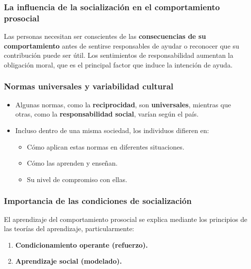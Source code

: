 \documentclass[
]{book}
\providecommand{\tightlist}{%
  \setlength{\itemsep}{0pt}\setlength{\parskip}{0pt}}
\begin{document}
\subsubsection{La influencia de la socialización en el comportamiento prosocial}\label{la-influencia-de-la-socializaciuxf3n-en-el-comportamiento-prosocial}

Las personas necesitan ser conscientes de las \textbf{consecuencias de su comportamiento} antes de sentirse responsables de ayudar o reconocer que su contribución puede ser útil. Los sentimientos de responsabilidad aumentan la obligación moral, que es el principal factor que induce la intención de ayuda.

\subsubsection{Normas universales y variabilidad cultural}\label{normas-universales-y-variabilidad-cultural}

\begin{itemize}
\tightlist
\item
  Algunas normas, como la \textbf{reciprocidad}, son \textbf{universales}, mientras que otras, como la \textbf{responsabilidad social}, varían según el país.\\
\item
  Incluso dentro de una misma sociedad, los individuos difieren en:

  \begin{itemize}
  \tightlist
  \item
    Cómo aplican estas normas en diferentes situaciones.
  \item
    Cómo las aprenden y enseñan.
  \item
    Su nivel de compromiso con ellas.
  \end{itemize}
\end{itemize}

\subsubsection{Importancia de las condiciones de socialización}\label{importancia-de-las-condiciones-de-socializaciuxf3n}

El aprendizaje del comportamiento prosocial se explica mediante los principios de las teorías del aprendizaje, particularmente:

\begin{enumerate}
\def\labelenumi{\arabic{enumi}.}
\tightlist
\item
  \textbf{Condicionamiento operante (refuerzo).}
\item
  \textbf{Aprendizaje social (modelado).}
\end{enumerate}
\end{document}
